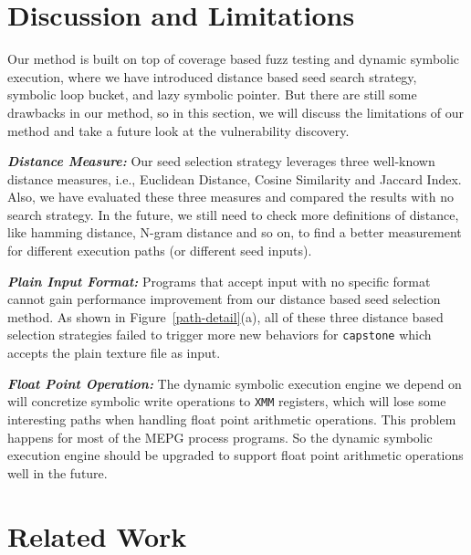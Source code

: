 \documentclass{cta-author}
\begin{document}
\section{Discussion and Limitations} \label{sec:discussion}
Our method is built on top of coverage based fuzz testing and dynamic symbolic execution, where we have introduced distance based seed search strategy, symbolic loop bucket, and lazy symbolic pointer. But there are still some drawbacks in our method, so in this section, we will discuss the limitations of our method and take a future look at the vulnerability discovery.

\noindent\textit{\textbf{Distance Measure:}} Our seed selection strategy leverages three well-known distance measures, i.e., Euclidean Distance, Cosine Similarity and Jaccard Index. Also, we have evaluated these three measures and compared the results with no search strategy. In the future, we still need to check more definitions of distance, like hamming distance, N-gram distance and so on, to find a better measurement for different execution paths (or different seed inputs). 

\noindent\textit{\textbf{Plain Input Format:}} Programs that accept input with no specific format cannot gain performance improvement from our distance based seed selection method.
 As shown in Figure~\ref{path-detail}(a), all of these three distance based selection strategies failed to trigger more new behaviors for \texttt{capstone} which accepts the plain texture file as input. 

\noindent\textit{\textbf{Float Point Operation:}} The dynamic symbolic execution engine we depend on will concretize symbolic write operations to \texttt{XMM} registers, which will lose some interesting paths when handling float point arithmetic operations. This problem happens for most of the MEPG process programs. So the dynamic symbolic execution engine should be upgraded to support float point arithmetic operations well in the future.

\section{Related Work} \label{sec:related}

\end{document}
